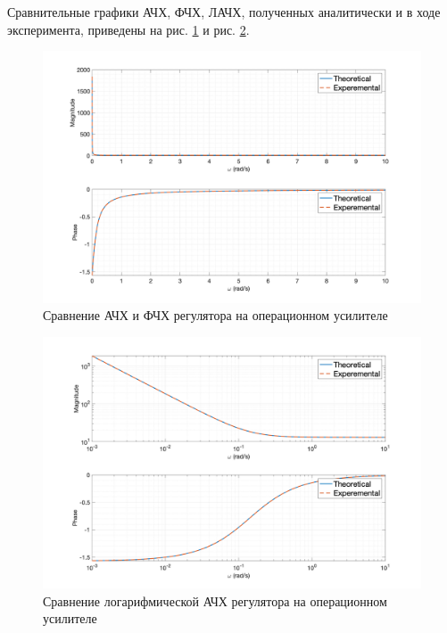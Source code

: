 Сравнительные графики АЧХ, ФЧХ, ЛАЧХ, полученных аналитически и в ходе эксперимента, приведены на рис. \ref{fig:task5_freq_resp_cmp_lin} и рис. \ref{fig:task5_freq_resp_cmp_loglog}.
\begin{figure}[ht!]
    \centering
    \includegraphics[width=\textwidth]{media/plots/task5_freq_resp_cmp_lin.png}
    \caption{Сравнение АЧХ и ФЧХ регулятора на операционном усилителе}
    \label{fig:task5_freq_resp_cmp_lin}
\end{figure}
\begin{figure}[ht!]
    \centering
    \includegraphics[width=\textwidth]{media/plots/task5_freq_resp_cmp_loglog.png}
    \caption{Сравнение логарифмической АЧХ регулятора на операционном усилителе}
    \label{fig:task5_freq_resp_cmp_loglog}
\end{figure}